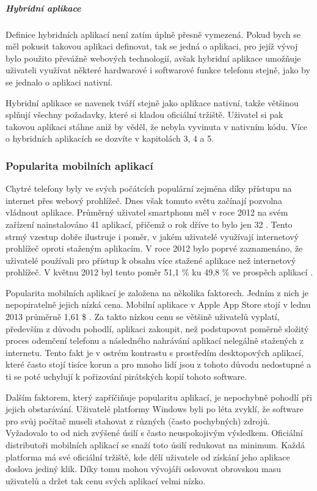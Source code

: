\subparagraph{Hybridní aplikace}
Definice hybridních aplikací není zatím úplně přesně vymezená. Pokud bych se měl pokusit takovou aplikaci definovat, tak se jedná o aplikaci, pro jejíž vývoj bylo použito převážně webových technologií, avšak hybridní aplikace umožňuje uživateli využívat některé hardwarové i softwarové funkce telefonu stejně, jako by se jednalo o aplikaci nativní.

Hybridní aplikace se navenek tváří stejně jako aplikace nativní, takže většinou splňují všechny požadavky, které si kladou oficiální tržiště. Uživatel si pak takovou aplikaci stáhne aniž by věděl, že nebyla vyvinuta v nativním kódu. Více o hybridních aplikacích se dozvíte v kapitolách 3, 4 a 5. %

\subsubsection{Popularita mobilních aplikací}
Chytré telefony byly ve svých počátcích populární zejména díky přístupu na internet přes webový prohlížeč. Dnes však tomuto světu začínají pozvolna vládnout aplikace. Průměrný uživatel smartphonu měl v roce 2012 na svém zařízení nainstalováno 41 aplikací, přičemž o rok dříve to bylo jen 32 \cite{mobile_app_usage_statistics}. Tento strmý vzestup dobře ilustruje i poměr, v jakém uživatelé využívají internetový prohlížeč oproti staženým aplikacím. V roce 2012 bylo poprvé zaznamenáno, že uživatelé používali pro přístup k obsahu více stažené aplikace než internetový prohlížeč. V květnu 2012 byl tento poměr 51,1 \% ku 49,8 \% ve prospěch aplikací \cite{comscore_report_may}.

Popularita mobilních aplikací je založena na několika faktorech. Jedním z nich je nepopiratelně jejich nízká cena. Mobilní aplikace v Apple App Store stojí v lednu 2013 průměrně 1,61 \$ \cite{app_store_metrics}. Za takto nízkou cenu se většině uživatelů vyplatí, především z důvodu pohodlí, aplikaci zakoupit, než podstupovat poměrně složitý proces odemčení telefonu a následného nahrávání aplikací nelegálně stažených z internetu. Tento fakt je v ostrém kontrastu s prostředím desktopových aplikací, které často stojí tisíce korun a pro mnoho lidí jsou z tohoto důvodu nedostupné a ti se poté uchylují k pořizování pirátských kopií tohoto software.

Dalším faktorem, který zapříčiňuje popularitu aplikací, je nepochybně pohodlí při jejich obstarávání. Uživatelé platformy Windows byli po léta zvyklí, že software pro svůj počítač museli stahovat z různých (často pochybných) zdrojů. Vyžadovalo to od nich zvýšené úsilí s často neuspokojivým výsledkem. Oficiální distributoři mobilních aplikací se snaží toto úsilí redukovat na minimum. Každá platforma má své oficiální tržiště, kde dělí uživatele od získání jeho aplikace doslova jediný klik. Díky tomu mohou vývojáři oslovovat obrovskou masu uživatelů a držet tak cenu svých aplikací velmi nízko.

